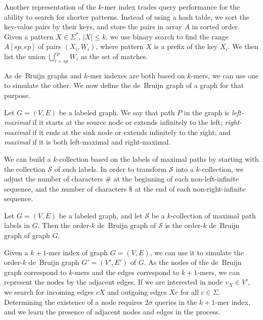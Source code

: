 \documentclass[a4paper,UKenglish]{lipics-v2016}
\newcommand{\abs}[1]{\ensuremath{\lvert #1 \rvert}}
\newcommand{\kmer}[1]{$#1$\nobreakdash-mer}
\newcommand{\kcollection}[1]{$#1$\nobreakdash-collection}
\newcommand{\orderk}[1]{order\nobreakdash-$#1$}
\begin{document}
Another representation of the \kmer{k} index trades query performance for the ability to search for shorter patterns. Instead of using a hash table, we sort the key-value pairs by their keys, and store the pairs in array $A$ in sorted order. Given a pattern $X \in \Sigma^{\ast}$, $\abs{X} \le k$, we use binary search to find the range $A[sp, ep]$ of pairs $(X_{i}, W_{i})$, where pattern $X$ is a prefix of the key $X_{i}$. We then list the union $\bigcup_{i=sp}^{ep} W_{i}$ as the set of matches.

As de~Bruijn graphs and \kmer{k} indexes are both based on \kmer{k}s, we can use one to simulate the other. We now define the de~Bruijn graph of a graph for that purpose.

\begin{definition}
Let $G = (V, E)$ be a labeled graph. We say that path $P$ in the graph is \emph{left-maximal} if it starts at the source node or extends infinitely to the left; \emph{right-maximal} if it ends at the sink node or extends infinitely to the right; and \emph{maximal} if it is both left-maximal and right-maximal.
\end{definition}

We can build a \kcollection{k} based on the labels of maximal paths by starting with the collection $\mathcal{S}$ of such labels. In order to transform $\mathcal{S}$ into a \kcollection{k}, we adjust the number of characters $\#$ at the beginning of each non-left-infinite sequence, and the number of characters $\$$ at the end of each non-right-infinite sequence.

\begin{definition}
Let $G = (V, E)$ be a labeled graph, and let $\mathcal{S}$ be a \kcollection{k} of maximal path labels in $G$. Then the \orderk{k} de~Bruijn graph of $\mathcal{S}$ is the \orderk{k} de~Bruijn graph of graph $G$.
\end{definition}

Given a \kmer{k+1} index of graph $G = (V, E)$, we can use it to simulate the \orderk{k} de~Bruijn graph $G' = (V', E')$ of $G$. As the nodes of the de~Bruijn graph correspond to \kmer{k}s and the edges correspond to \kmer{k+1}s, we can represent the nodes by the adjacent edges. If we are interested in node $v_{X} \in V'$, we search for incoming edges $cX$ and outgoing edges $Xc$ for all $c \in \Sigma$. Determining the existence of a node requires $2 \sigma$ queries in the \kmer{k+1} index, and we learn the presence of adjacent nodes and edges in the process.
\end{document}
